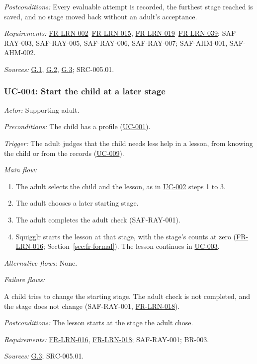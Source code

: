 \documentclass[12pt]{article}
\renewcommand{\_}{\textunderscore\allowbreak}%
\newcommand{\goalref}[1]{\hyperref[goal:#1]{G.#1}}
\newcommand{\ucref}[1]{\hyperref[uc:#1]{\mbox{UC-#1}}}
\newcommand{\reqfield}[2]{\noindent\textit{#1:} #2\par}
\newcommand{\reqref}[1]{\hyperref[req:#1]{#1}}
\providecommand{\ucref}[1]{\hyperref[uc:#1]{UC-#1}}
\begin{document}
\reqfield{Postconditions}{Every evaluable attempt is recorded, the furthest
stage reached is saved, and no stage moved back without an adult's acceptance.}
\reqfield{Requirements}{\mbox{\reqref{FR-LRN-002}}--\mbox{\reqref{FR-LRN-015}},
\mbox{\reqref{FR-LRN-019}}--\mbox{\reqref{FR-LRN-039}}; \mbox{SAF-RAY-003},
\mbox{SAF-RAY-005}, \mbox{SAF-RAY-006}, \mbox{SAF-RAY-007}; \mbox{SAF-AHM-001},
\mbox{SAF-AHM-002}.} \reqfield{Sources}{\goalref{1}, \goalref{2}, \goalref{3};
\mbox{SRC-005.01}.}

\subsubsection{UC-004: Start the child at a later stage}
\label{puc:004}
\reqfield{Actor}{Supporting adult.}
\reqfield{Preconditions}{The child has a profile (\ucref{001}).}
\reqfield{Trigger}{The adult judges that the child needs less help in a lesson,
from knowing the child or from the records (\ucref{009}).} \noindent\textit{Main
flow:}
\begin{enumerate}[nosep, leftmargin=2.2em]
  \item The adult selects the child and the lesson, as in \ucref{002} steps 1 to
  3.
  \item The adult chooses a later starting stage.
  \item The adult completes the adult check (\mbox{SAF-RAY-001}).
  \item Squigglr starts the lesson at that stage, with the stage's counts at
  zero (\mbox{\reqref{FR-LRN-016}}; Section~\ref{sec:fr-formal}). The lesson
  continues in \ucref{003}.
\end{enumerate}
\noindent\textit{Alternative flows:} None.
\par
\noindent\textit{Failure flows:}
\begin{description}[nosep, leftmargin=2.2em, font=\normalfont]
  \item[3a.] A child tries to change the starting stage. The adult check is not
  completed, and the stage does not change (\mbox{SAF-RAY-001},
  \mbox{\reqref{FR-LRN-018}}).
\end{description}
\reqfield{Postconditions}{The lesson starts at the stage the adult chose.}
\reqfield{Requirements}{\mbox{\reqref{FR-LRN-016}}, \mbox{\reqref{FR-LRN-018}};
\mbox{SAF-RAY-001}; BR-003.} \reqfield{Sources}{\goalref{3}; \mbox{SRC-005.01}.}
\end{document}
